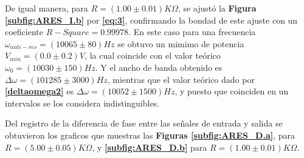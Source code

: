 \documentclass[11pt,a4paper]{article}
\begin{document}
De igual manera, para $R=(1.00 \pm 0.01)K\Omega$, se ajustó la \textbf{Figura \ref{subfig:ARES_I.b}} por \textbf{\eqref{eq:3}}, confirmando la bondad de este ajuste con un coeficiente $R-Square = 0.99978$. En este caso para una frecuencia $\omega_{anti-res} =(10065 \pm 80)Hz$ se obtuvo un mimimo de potencia $V_{min} = (0.0 \pm 0.2)V$, la cual coincide con el valor teórico $\omega_0 = (10030 \pm 150) Hz$. Y el ancho de banda obtenido es $\Delta\omega = (101285 \pm 3000)Hz$, mientras que el valor teórico dado por \textbf{\eqref{deltaomega2}} es $\Delta\omega = (10052 \pm 1500)Hz$, y puesto que coinciden en un intervalos se los considera indistinguibles.

\bigskip

Del registro de la diferencia de fase entre las señales de entrada y salida se obtuvieron los graficos que muestras las \textbf{Figuras \ref{subfig:ARES_D.a}}, para $R=(5.00 \pm 0.05)K\Omega$, y \textbf{\ref{subfig:ARES_D.b}} para $R=(1.00 \pm 0.01)K\Omega$.
\end{document}
